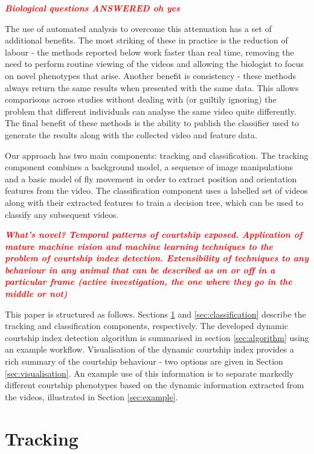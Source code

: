 \documentclass[twocolumn]{article}
\newcommand{\todo}[1]{\textsf{\emph{\textbf{\textcolor{red}{#1}}}}}
\begin{document}
\todo{Biological questions ANSWERED oh yes}

The use of automated analysis to overcome this attenuation has a set of additional benefits. The most striking of these in practice is the reduction of labour - the methods reported below work faster than real time, removing the need to perform routine viewing of the videos and allowing the biologist to focus on novel phenotypes that arise. Another benefit is consistency - these methods always return the same results when presented with the same data. This allows comparisons across studies without dealing with (or guiltily ignoring) the problem that different individuals can analyse the same video quite differently. The final benefit of these methods is the ability to publish the classifier used to generate the results along with the collected video and feature data.

Our approach has two main components: tracking and classification. The tracking component combines a background model, a sequence of image manipulations and a basic model of fly movement in order to extract position and orientation features from the video. The classification component uses a labelled set of videos along with their extracted features to train a decision tree, which can be used to classify any subsequent videos. 

\todo{What's novel? Temporal patterns of courtship exposed. Application of mature machine vision and machine learning techniques to the problem of courtship index detection. Extensibility of techniques to any behaviour in any animal that can be described as on or off in a particular frame (active investigation, the one where they go in the middle or not)}

This paper is structured as follows. Sections \ref{sec:tracking} and \ref{sec:classification} describe the tracking and classification components, respectively. The developed dynamic courtship index detection algorithm is summarised in section \ref{sec:algorithm} using an example workflow. Visualisation of the dynamic courtship index provides a rich summary of the courtship behaviour - two options are given in Section \ref{sec:visualisation}. An example use of this information is to separate markedly different courtship phenotypes based on the dynamic information extracted from the videos, illustrated in Section \ref{sec:example}.

\section{Tracking}
\label{sec:tracking}
\end{document}
